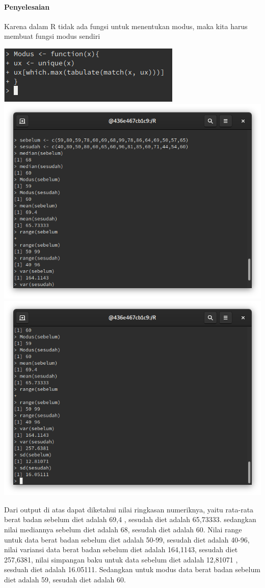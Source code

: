 \documentclass[a4paper,12pt]{article}
\begin{document}
\paragraph{Penyelesaian\\}
Karena dalam R tidak ada fungsi untuk menentukan modus, maka kita harus membuat fungsi modus sendiri
\begin{center}
	\includegraphics[scale=1]{fungsi}
	\includegraphics[scale=.6]{tugas1}
	\includegraphics[scale=.6]{tugas2}
\end{center}
Dari output di atas dapat diketahui nilai ringkasan numeriknya, yaitu rata-rata berat badan sebelum diet adalah 69,4 , sesudah diet adalah 65,73333. sedangkan nilai mediannya sebelum diet adalah 68, sesudah diet adalah 60. Nilai range untuk data berat badan sebelum diet adalah 50-99, sesudah diet adalah 40-96, nilai variansi data berat badan sebelum diet adalah  164,1143, sesudah diet 257,6381, nilai simpangan baku untuk data sebelum diet adalah 12,81071 , sesduah diet adalah 16.05111. Sedangkan untuk modus data berat badan sebelum diet adalah 59, sesudah diet adalah 60.\\
\end{document}
